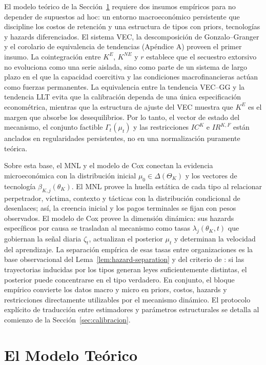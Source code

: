 \documentclass[review,authoryear,12pt]{elsarticle}
\theoremstyle{plain}
\theoremstyle{definition}
\newcommand{\ThetaK}{\Theta_K}
\newcommand{\1}{\mathbf{1}}
\begin{document}
El modelo teórico de la Sección~\ref{sec:model} requiere dos insumos empíricos para no depender de supuestos ad hoc: un entorno macroeconómico persistente que discipline los costos de retención y una estructura de tipos con priors, tecnologías y hazards diferenciados. El sistema VEC, la descomposición de Gonzalo--Granger y el corolario de equivalencia de tendencias (Apéndice A) proveen el primer insumo. La cointegración entre $K^E$, $K^{NE}$ y $r$ establece que el secuestro extorsivo no evoluciona como una serie aislada, sino como parte de un sistema de largo plazo en el que la capacidad coercitiva y las condiciones macrofinancieras actúan como fuerzas permanentes. La equivalencia entre la tendencia VEC--GG y la tendencia LLT evita que la calibración dependa de una única especificación econométrica, mientras que la estructura de ajuste del VEC muestra que $K^E$ es el margen que absorbe los desequilibrios. Por lo tanto, el vector de estado del mecanismo, el conjunto factible $\Gamma_t(\mu_t)$ y las restricciones $IC^K$ e $IR^{K,F}$ están anclados en regularidades persistentes, no en una normalización puramente teórica.

Sobre esta base, el MNL y el modelo de Cox conectan la evidencia microeconómica con la distribución inicial $\mu_0\in\Delta(\ThetaK)$ y los vectores de tecnología $\beta_{K,j}(\theta_K)$. El MNL provee la huella estática de cada tipo al relacionar perpetrador, víctima, contexto y tácticas con la distribución condicional de desenlaces; así, la creencia inicial y los pagos terminales se fijan con pesos observados. El modelo de Cox provee la dimensión dinámica: sus hazards específicos por causa se trasladan al mecanismo como tasas $\lambda_j(\theta_K,t)$ que gobiernan la señal diaria $\zeta_t$, actualizan el posterior $\mu_t$ y determinan la velocidad del aprendizaje. La separación empírica de esas tasas entre organizaciones es la base observacional del Lema~\ref{lem:hazard-separation} y del criterio de \citet{Kakutani1948}: si las trayectorias inducidas por los tipos generan leyes suficientemente distintas, el posterior puede concentrarse en el tipo verdadero. En conjunto, el bloque empírico convierte los datos macro y micro en priors, costos, hazards y restricciones directamente utilizables por el mecanismo dinámico. El protocolo explícito de traducción entre estimadores y parámetros estructurales se detalla al comienzo de la Sección~\ref{sec:calibracion}.

\section{El Modelo Teórico}\label{sec:model}
\end{document}
